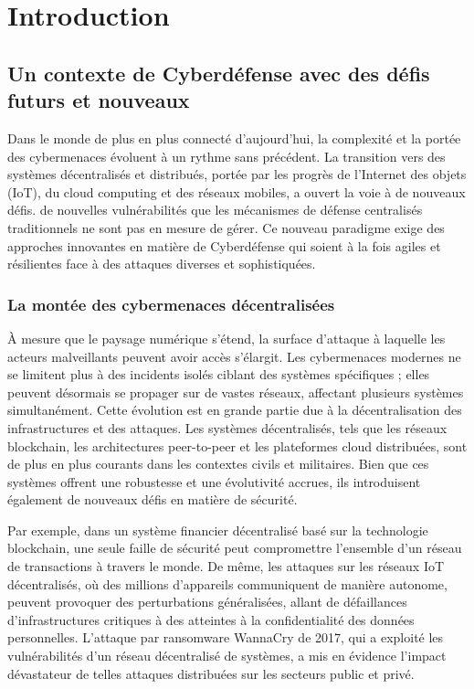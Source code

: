 \chapter{Introduction}\label{ch:introduction}

\section{Un contexte de Cyberdéfense avec des défis futurs et nouveaux}

Dans le monde de plus en plus connecté d'aujourd'hui, la complexité et la portée des cybermenaces évoluent à un rythme sans précédent. La transition vers des systèmes décentralisés et distribués, portée par les progrès de l'Internet des objets (IoT), du cloud computing et des réseaux mobiles, a ouvert la voie à de nouveaux défis. de nouvelles vulnérabilités que les mécanismes de défense centralisés traditionnels ne sont pas en mesure de gérer\cite{sun2014data}. Ce nouveau paradigme exige des approches innovantes en matière de Cyberdéfense qui soient à la fois agiles et résilientes face à des attaques diverses et sophistiquées\cite{taddeo2019trusting}.

\subsection{La montée des cybermenaces décentralisées}

À mesure que le paysage numérique s’étend, la surface d’attaque à laquelle les acteurs malveillants peuvent avoir accès s’élargit. Les cybermenaces modernes ne se limitent plus à des incidents isolés ciblant des systèmes spécifiques ; elles peuvent désormais se propager sur de vastes réseaux, affectant plusieurs systèmes simultanément. Cette évolution est en grande partie due à la décentralisation des infrastructures et des attaques. Les systèmes décentralisés, tels que les réseaux blockchain, les architectures peer-to-peer et les plateformes cloud distribuées, sont de plus en plus courants dans les contextes civils et militaires. Bien que ces systèmes offrent une robustesse et une évolutivité accrues, ils introduisent également de nouveaux défis en matière de sécurité.

Par exemple, dans un système financier décentralisé basé sur la technologie blockchain, une seule faille de sécurité peut compromettre l’ensemble d’un réseau de transactions à travers le monde\cite{li2020survey}. De même, les attaques sur les réseaux IoT décentralisés, où des millions d’appareils communiquent de manière autonome, peuvent provoquer des perturbations généralisées, allant de défaillances d’infrastructures critiques à des atteintes à la confidentialité des données personnelles\cite{sun2014data}. L’attaque par ransomware WannaCry de 2017, qui a exploité les vulnérabilités d’un réseau décentralisé de systèmes, a mis en évidence l’impact dévastateur de telles attaques distribuées sur les secteurs public et privé\cite{mohurle2017wannacry}.

